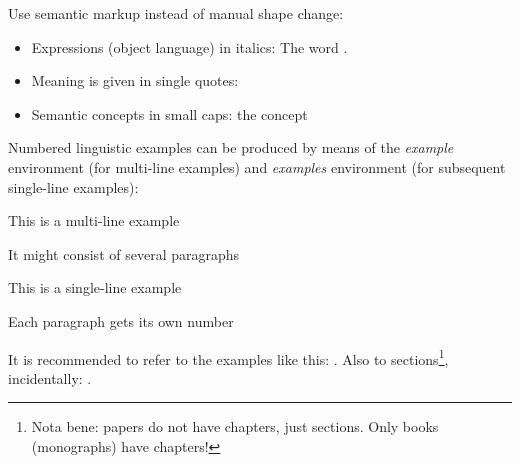 \documentclass[naustrian,english]{univie-ling-paper}
\begin{document}
Use semantic markup instead of manual shape change:
\begin{itemize}
	\item Expressions (object language) in italics: The word .
	\item Meaning is given in single quotes: 
	\item Semantic concepts in small caps: the concept 
\end{itemize}
%
Numbered linguistic examples can be produced by means of the \emph{example} environment (for multi-line examples) and \emph{examples}
environment (for subsequent single-line examples):

\begin{example}
	This is a multi-line example
	
	It might consist of several paragraphs
\end{example}

\begin{examples}
	\item This is a single-line example\label{exa:example-single}
	\item Each paragraph gets its own number
\end{examples}
%
It is recommended to refer to the examples like this: . Also to sections\footnote{Nota bene: papers do not
	have chapters, just sections. Only books (monographs) have chapters!}, incidentally: .

\clearpage
\printbibliography[heading=bibnumbered]
\end{document}

